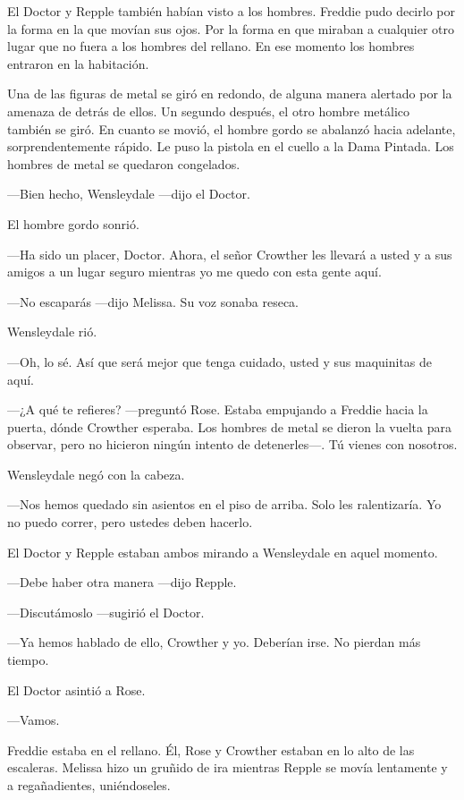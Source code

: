 {El Doctor y Repple también habían visto a los hombres. Freddie pudo
	decirlo por la forma en la que movían sus ojos. Por la forma en que
	miraban a cualquier otro lugar que no fuera a los hombres del rellano.
En ese momento los hombres entraron en la habitación.}

{Una de las figuras de metal se giró en redondo, de alguna manera
	alertado por la amenaza de detrás de ellos. Un segundo después, el otro
	hombre metálico también se giró. En cuanto se movió, el hombre gordo se
	abalanzó hacia adelante, sorprendentemente rápido. Le puso la pistola en
	el cuello a la Dama Pintada. Los hombres de metal se quedaron
congelados.}

{---Bien hecho, Wensleydale ---dijo el Doctor.}

{El hombre gordo sonrió.}

{---Ha sido un placer, Doctor. Ahora, el señor Crowther les llevará a
	usted y a sus amigos a un lugar seguro mientras yo me quedo con esta
gente aquí.}

{---No escaparás ---dijo Melissa. Su voz sonaba reseca.}

{Wensleydale rió.}

{---Oh, lo sé. Así que será mejor que tenga cuidado, usted y sus
maquinitas de aquí.}

{---¿A qué te refieres? ---preguntó Rose. Estaba empujando a Freddie
	hacia la puerta, dónde Crowther esperaba. Los hombres de metal se dieron
	la vuelta para observar, pero no hicieron ningún intento de
detenerles---. Tú vienes con nosotros.}

{Wensleydale negó con la cabeza.}

{---Nos hemos quedado sin asientos en el piso de arriba. Solo les
ralentizaría. Yo no puedo correr, pero ustedes deben hacerlo.}

{El Doctor y Repple estaban ambos mirando a Wensleydale en aquel
momento.}

{---Debe haber otra manera ---dijo Repple.}

{---Discutámoslo ---sugirió el Doctor.}

{---Ya hemos hablado de ello, Crowther y yo. Deberían irse. No pierdan
más tiempo.}

{El Doctor asintió a Rose.}

{---Vamos.}

{Freddie estaba en el rellano. Él, Rose y Crowther estaban en lo alto de
	las escaleras. Melissa hizo un gruñido de ira mientras Repple se movía
lentamente y a regañadientes, uniéndoseles.}

